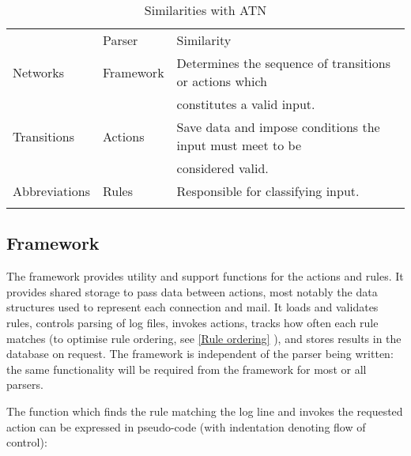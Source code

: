 \documentclass[draft]{svmult}
\newcommand{\refwithpage}[1]{%
    \empty{}\vref{#1}%
}
\newcommand{\sectionref}[1]{%
    \textsection{}\vref*{#1}%
}
\begin{document}

\begin{table}[ht]
    \caption{Similarities with ATN}\label{Similarities with ATN}
    \begin{tabular}[]{lll}
        \hline
        \noalign{\smallskip}
        \ATN{}        & Parser    & Similarity                          \\
        \noalign{\smallskip}
        \hline
        \noalign{\smallskip}
        Networks      & Framework & Determines the sequence of
                                    transitions or actions which        \\
                      &           & constitutes a valid input.          \\
        Transitions   & Actions   & Save data and impose conditions the
                                    input must meet to be               \\
                      &           & considered valid.                   \\
        Abbreviations & Rules     & Responsible for classifying input.  \\
        \noalign{\smallskip}
        \hline
        \noalign{\smallskip}
    \end{tabular}
\end{table}

\subsection{Framework}

\label{Framework}

The framework provides utility and support functions for the actions and
rules.  It provides shared storage to pass data between actions, most
notably the data structures used to represent each connection and mail.  It
loads and validates rules, controls parsing of log files, invokes actions,
tracks how often each rule matches (to optimise rule ordering, see
\sectionref{Rule ordering}), and stores results in the database on request.
The framework is independent of the parser being written: the same
functionality will be required from the framework for most or all parsers.

The function which finds the rule matching the log line and invokes the
requested action can be expressed in pseudo-code (with indentation denoting
flow of control):

\end{document}
